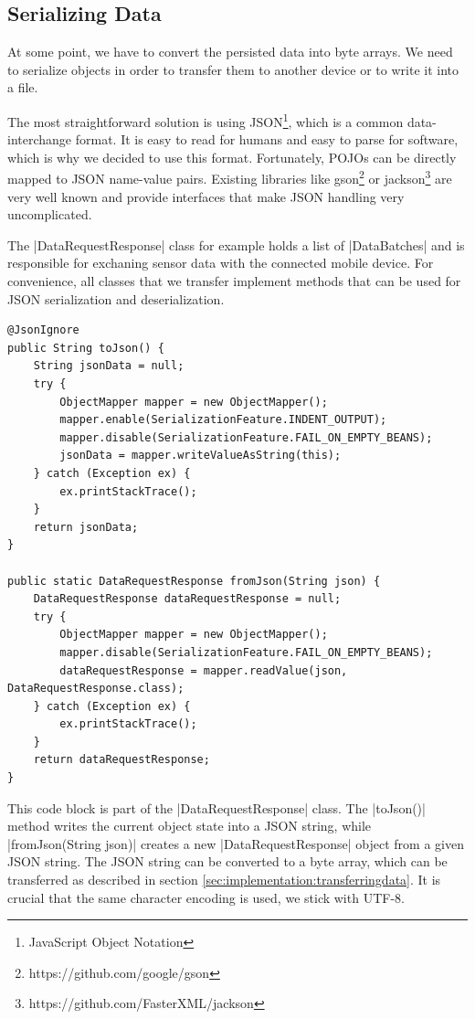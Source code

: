 \subsection{Serializing Data}
\label{sec:implementation:serializingdata}

At some point, we have to convert the persisted data into byte arrays.
We need to serialize objects in order to transfer them to another device or to write it into a file.

The most straightforward solution is using JSON\footnote{JavaScript Object Notation}, which is a common data-interchange format.
It is easy to read for humans and easy to parse for software, which is why we decided to use this format.
Fortunately, POJOs can be directly mapped to JSON name-value pairs.
Existing libraries like gson\footnote{https://github.com/google/gson} or jackson\footnote{https://github.com/FasterXML/jackson} are very well known and provide interfaces that make JSON handling very uncomplicated.

The |DataRequestResponse|\cite{sensordatalogger:datarequestresponse} class for example holds a list of |DataBatches| and is responsible for exchaning sensor data with the connected mobile device.
For convenience, all classes that we transfer implement methods that can be used for JSON serialization and deserialization.

\begin{lstlisting}[label=serialization]
@JsonIgnore
public String toJson() {
	String jsonData = null;
	try {
		ObjectMapper mapper = new ObjectMapper();
		mapper.enable(SerializationFeature.INDENT_OUTPUT);
		mapper.disable(SerializationFeature.FAIL_ON_EMPTY_BEANS);
		jsonData = mapper.writeValueAsString(this);
	} catch (Exception ex) {
		ex.printStackTrace();
	}
	return jsonData;
}

public static DataRequestResponse fromJson(String json) {
	DataRequestResponse dataRequestResponse = null;
	try {
		ObjectMapper mapper = new ObjectMapper();
		mapper.disable(SerializationFeature.FAIL_ON_EMPTY_BEANS);
		dataRequestResponse = mapper.readValue(json, DataRequestResponse.class);
	} catch (Exception ex) {
		ex.printStackTrace();
	}
	return dataRequestResponse;
}
\end{lstlisting}

This code block is part of the |DataRequestResponse| class.
The |toJson()| method writes the current object state into a JSON string, while |fromJson(String json)| creates a new |DataRequestResponse| object from a given JSON string.
The JSON string can be converted to a byte array, which can be transferred as described in section \ref{sec:implementation:transferringdata}.
It is crucial that the same character encoding is used, we stick with UTF-8.

